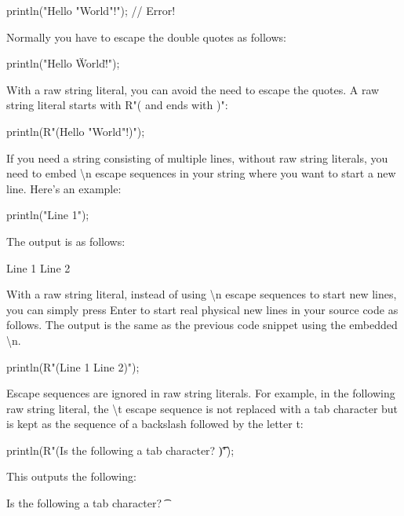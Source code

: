 \begin{cpp}
println("Hello "World"!"); // Error!
\end{cpp}

Normally you have to escape the double quotes as follows:

\begin{cpp}
println("Hello \"World\"!");
\end{cpp}

With a raw string literal, you can avoid the need to escape the quotes. A raw string literal starts with R"( and ends with )":

\begin{cpp}
println(R"(Hello "World"!)");
\end{cpp}

If you need a string consisting of multiple lines, without raw string literals, you need to embed \textbackslash{}n escape sequences in your string where you want to start a new line. Here’s an example:

\begin{cpp}
println("Line 1");
\end{cpp}

The output is as follows:

\begin{shell}
Line 1
Line 2
\end{shell}

With a raw string literal, instead of using \textbackslash{}n escape sequences to start new lines, you can simply press Enter to start real physical new lines in your source code as follows. The output is the same as the previous code snippet using the embedded \textbackslash{}n.

\begin{cpp}
println(R"(Line 1
Line 2)");
\end{cpp}

Escape sequences are ignored in raw string literals. For example, in the following raw string literal, the \textbackslash{}t escape sequence is not replaced with a tab character but is kept as the sequence of a backslash followed by the letter t:

\begin{cpp}
println(R"(Is the following a tab character? \t)");
\end{cpp}

This outputs the following:

\begin{cpp}
Is the following a tab character? \t
\end{cpp}

